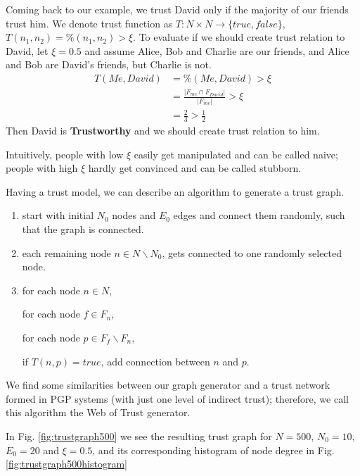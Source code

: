 Coming back to our example, we trust David only if the majority of our friends trust him. We denote trust function as $T : N \times N \rightarrow \{true, false\}$, $T(n_1,n_2) = \%(n_1,n_2) > \xi$. 
To evaluate if we should create trust relation to David, let $\xi = 0.5$ and assume Alice, Bob and Charlie are our friends, and Alice and Bob are David's friends, but Charlie is not.
\begin{equation}
\begin{split}
T(Me, David) &= \%(Me, David) > \xi \\
&= \frac{|F_{me} \cap F_{David}|}{|F_{me}|} > \xi \\
&= \frac{2}{3} > \frac{1}{2}
\end{split}
\end{equation}
Then David is \textbf{Trustworthy} and we should create trust relation to him.

Intuitively, people with low $\xi$ easily get manipulated and can be called naive; people with high $\xi$ hardly get convinced and can be called stubborn. 

Having a trust model, we can describe an algorithm to generate a trust graph.
\begin{enumerate}
    \item start with initial $N_0$ nodes and $E_0$ edges and connect them randomly, such that the graph is connected.
    \item each remaining node $n \in N \backslash N_0$, gets connected to one randomly selected node.
    \item for each node $n \in N$,

\quad for each node $f \in F_n$,

\quad \quad for each node $p \in F_f \backslash F_n$,

\quad \quad \quad if $T(n, p) = true$, add connection between $n$ and $p$.
\end{enumerate}

We find some similarities between our graph generator and a trust network formed in PGP systems \cite{RFC4880O31:online} (with just one level of indirect trust); therefore, we call this algorithm the Web of Trust generator.

In Fig. \ref{fig:trustgraph500} we see the resulting trust graph for $N=500$, $N_0=10$, $E_0=20$ and $\xi = 0.5$, and its corresponding histogram of node degree in Fig. \ref{fig:trustgraph500histogram}

